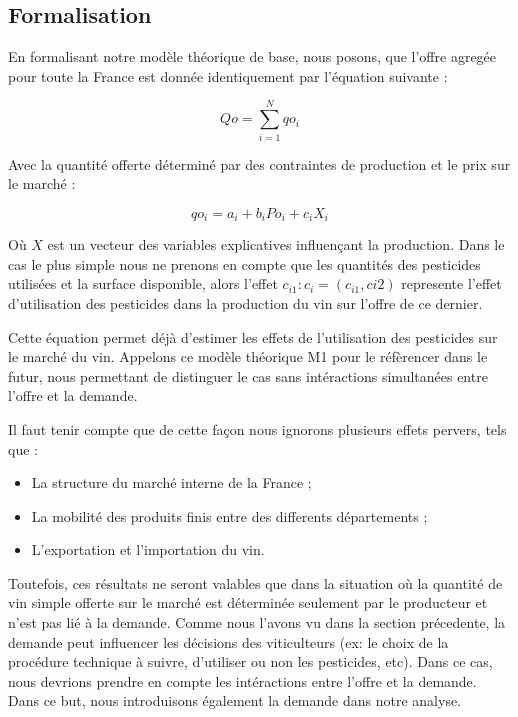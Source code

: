 \documentclass[11pt,]{article}
\providecommand{\tightlist}{%
  \setlength{\itemsep}{0pt}\setlength{\parskip}{0pt}}
\begin{document}
\hypertarget{formalisation}{%
\subsection{Formalisation}\label{formalisation}}

En formalisant notre modèle théorique de base, nous posons, que l'offre
agregée pour toute la France est donnée identiquement par l'équation
suivante :

\begin{equation}
    Qo = \sum_{i = 1}^{N} qo_i
\end{equation}

Avec la quantité offerte déterminé par des contraintes de production et
le prix sur le marché :

\begin{equation}
    qo_i = a_i + b_i Po_i + c_i X_i
\end{equation}

Où \(X\) est un vecteur des variables explicatives influençant la
production. Dans le cas le plus simple nous ne prenons en compte que les
quantités des pesticides utilisées et la surface disponible, alors
l'effet \(c_{i1} : c_i = (c_{i1}, c{i2})\) represente l'effet
d'utilisation des pesticides dans la production du vin sur l'offre de ce
dernier.

Cette équation permet déjà d'estimer les effets de l'utilisation des
pesticides sur le marché du vin. Appelons ce modèle théorique M1 pour le
réfèrencer dans le futur, nous permettant de distinguer le cas sans
intéractions simultanées entre l'offre et la demande.

Il faut tenir compte que de cette façon nous ignorons plusieurs effets
pervers, tels que :

\begin{itemize}
\tightlist
\item
  La structure du marché interne de la France ;
\item
  La mobilité des produits finis entre des differents départements ;
\item
  L'exportation et l'importation du vin.
\end{itemize}

Toutefois, ces résultats ne seront valables que dans la situation où la
quantité de vin simple offerte sur le marché est déterminée seulement
par le producteur et n'est pas lié à la demande. Comme nous l'avons vu
dans la section précedente, la demande peut influencer les décisions des
viticulteurs (ex: le choix de la procédure technique à suivre,
d'utiliser ou non les pesticides, etc). Dans ce cas, nous devrions
prendre en compte les intéractions entre l'offre et la demande. Dans ce
but, nous introduisons également la demande dans notre analyse.
\end{document}
